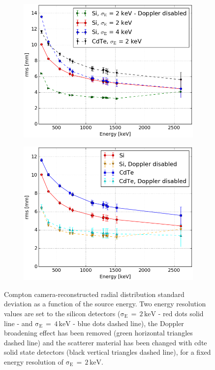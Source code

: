 \begin{figure}
\begin{subfigure}[t]{.5\textwidth}
\centering
\includegraphics[width=\linewidth]{03_GraphicFiles/chapter5_SPECTsimu/SPECT/compton/ENC/rmsVSenergy_ENCstudy_Doppler} 
\caption{}
\label{chap5::subfig::ENCSi}
\end{subfigure}
\begin{subfigure}[t]{.5\textwidth}
\centering
\includegraphics[width=\linewidth]{03_GraphicFiles/chapter5_SPECTsimu/SPECT/compton/ENC/rmsVSenergy_ENCstudy_Doppler_CdTe} 
\caption{}
\label{chap5::subfig::ENCSi}
\end{subfigure}
\caption{Compton camera-reconstructed radial distribution standard deviation as a function of the source energy. Two energy resolution values are set to the silicon detectors ($\mathrm{\sigma_{E}\,=\,2\,keV}$ - red dots solid line - and $\mathrm{\sigma_{E}\,=\,4\,keV}$ - blue dots dashed line), the Doppler broadening effect has been removed (green horizontal triangles dashed line) and the scatterer material has been changed with \gls{cdte} solid state detectors (black vertical triangles dashed line), for a fixed energy resolution of $\mathrm{\sigma_{E}\,=\,2\,keV}$.}
\label{chap5::fig::ENC_study}
\end{figure}      
     
